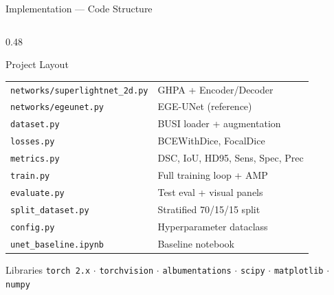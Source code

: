 \documentclass[aspectratio=169,10pt]{beamer}
\begin{document}
\begin{frame}{Implementation --- Code Structure}
  \begin{columns}[T]
    \begin{column}{0.48\textwidth}
      \begin{block}{Project Layout}
        \scriptsize
        \begin{tabular}{ll}
          \texttt{networks/superlightnet\_2d.py} & GHPA + Encoder/Decoder\\
          \texttt{networks/egeunet.py}           & EGE-UNet (reference)\\
          \texttt{dataset.py}   & BUSI loader + augmentation\\
          \texttt{losses.py}    & BCEWithDice, FocalDice\\
          \texttt{metrics.py}   & DSC, IoU, HD95, Sens, Spec, Prec\\
          \texttt{train.py}     & Full training loop + AMP\\
          \texttt{evaluate.py}  & Test eval + visual panels\\
          \texttt{split\_dataset.py} & Stratified 70/15/15 split\\
          \texttt{config.py}    & Hyperparameter dataclass\\
          \texttt{unet\_baseline.ipynb} & Baseline notebook\\
        \end{tabular}
      \end{block}

      \vspace{4pt}
      \begin{block}{Libraries}
        \texttt{torch 2.x} $\cdot$ \texttt{torchvision}
        $\cdot$ \texttt{albumentations} $\cdot$ \texttt{scipy}
        $\cdot$ \texttt{matplotlib} $\cdot$ \texttt{numpy}
      \end{block}
    \end{column}


\end{columns}
\end{frame}
\end{document}
